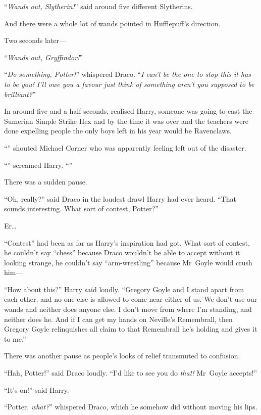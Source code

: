 “\emph{Wands out, Slytherin!}” said around five different Slytherins.

And there were a whole lot of wands pointed in Hufflepuff’s direction.

Two seconds later—

“\emph{Wands out, Gryffindor!}”

“\emph{Do something, Potter!}” whispered Draco. “\emph{I can’t be the one to stop this it has to be you! I’ll owe you a favour just think of something aren’t you supposed to be brilliant?}”

In around five and a half seconds, realised Harry, someone was going to cast the Sumerian Simple Strike Hex and by the time it was over and the teachers were done expelling people the only boys left in his year would be Ravenclaws.

“” shouted Michael Corner who was apparently feeling left out of the disaster.

“” screamed Harry. “”

There was a sudden pause.

“Oh, really?” said Draco in the loudest drawl Harry had ever heard. “That sounds interesting. What sort of contest, Potter?”

Er…

“Contest” had been as far as Harry’s inspiration had got. What sort of contest, he couldn’t say “chess” because Draco wouldn’t be able to accept without it looking strange, he couldn’t say “arm-wrestling” because Mr~Goyle would crush him—

“How about this?” Harry said loudly. “Gregory Goyle and I stand apart from each other, and no-one else is allowed to come near either of us. We don’t use our wands and neither does anyone else. I don’t move from where I’m standing, and neither does he. And if I can get my hands on Neville’s Remembrall, then Gregory Goyle relinquishes all claim to that Remembrall he’s holding and gives it to me.”

There was another pause as people’s looks of relief transmuted to confusion.

“Hah, Potter!” said Draco loudly. “I’d like to see you do \emph{that!} Mr~Goyle accepts!”

“It’s on!” said Harry.

“Potter, \emph{what?}” whispered Draco, which he somehow did without moving his lips.

